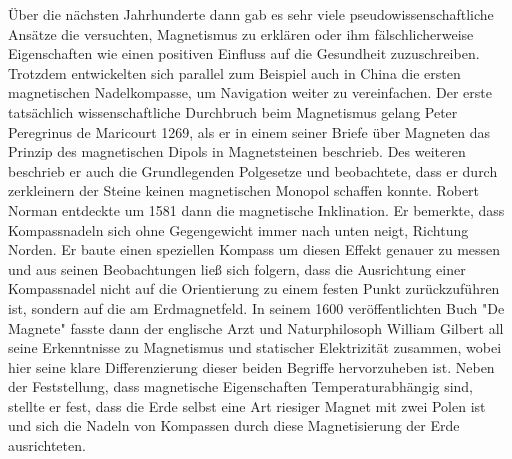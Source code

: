 \documentclass[12pt, a4paper]{article}
\begin{document}
Über die nächsten Jahrhunderte dann gab es sehr viele pseudowissenschaftliche Ansätze die versuchten, Magnetismus zu erklären oder ihm fälschlicherweise Eigenschaften wie einen positiven Einfluss auf die Gesundheit zuzuschreiben. Trotzdem entwickelten sich parallel zum Beispiel auch in China die ersten magnetischen Nadelkompasse, um Navigation weiter zu vereinfachen\cite{metioui22}.\newline
Der erste tatsächlich wissenschaftliche Durchbruch beim Magnetismus gelang Peter Peregrinus de Maricourt 1269, als er in einem seiner Briefe über Magneten das Prinzip des magnetischen Dipols in Magnetsteinen beschrieb. Des weiteren beschrieb er auch die Grundlegenden Polgesetze und beobachtete, dass er durch zerkleinern der Steine keinen magnetischen Monopol schaffen konnte\cite{metioui22}.\newline
Robert Norman entdeckte um 1581 dann die magnetische Inklination. Er bemerkte, dass Kompassnadeln sich ohne Gegengewicht immer nach unten neigt, Richtung Norden. Er baute einen speziellen Kompass um diesen Effekt genauer zu messen und aus seinen Beobachtungen ließ sich folgern, dass die Ausrichtung einer Kompassnadel nicht auf die Orientierung zu einem festen Punkt zurückzuführen ist, sondern auf die am Erdmagnetfeld\cite{metioui22}.\newline
In seinem 1600 veröffentlichten Buch "De Magnete" fasste dann der englische Arzt und Naturphilosoph William Gilbert all seine Erkenntnisse zu Magnetismus und statischer Elektrizität zusammen, wobei hier seine klare Differenzierung dieser beiden Begriffe hervorzuheben ist. Neben der Feststellung, dass magnetische Eigenschaften Temperaturabhängig sind, stellte er fest, dass die Erde selbst eine Art riesiger Magnet mit zwei Polen ist und sich die Nadeln von Kompassen durch diese Magnetisierung der Erde ausrichteten\cite{singh19}.\paragraph{}
\end{document}
